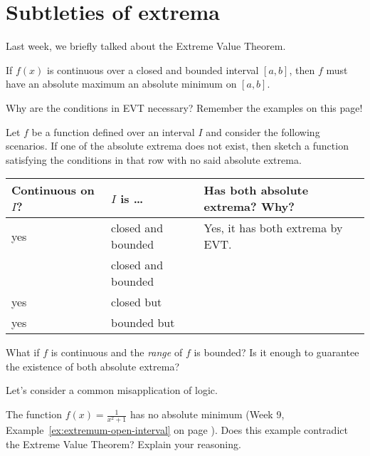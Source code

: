 \documentclass[../main.tex]{subfiles}
\begin{document}
 \section{Subtleties of extrema}
  Last week, we briefly talked about the Extreme Value Theorem.
  \begin{mdframed}[style=withref-compact]
    If \(f(x)\) is continuous over a closed and bounded interval \([a,b]\), then \(f\) must have an absolute maximum  an absolute minimum on \([a,b]\).

  \end{mdframed}

  Why are the conditions  in EVT necessary? Remember the examples on this page!

  \begin{example}
    Let \(f\) be a function defined over an interval \(I\) and consider the following scenarios. If one of the absolute extrema does not exist, then sketch a function satisfying the conditions in that row with no said absolute extrema.

    \begin{center}
      \begin{tabular}{p{1in}|l|p{4in}}
        \parbox{1in}{Continuous\\on \(I\)?} & \(I\) is \ldots{} & Has both absolute extrema? Why? \\ \midrule
        yes & closed and bounded & Yes, it has both extrema by EVT. \\\midrule
         & closed and bounded & \\[1in] \midrule
        yes & closed but  & \\[1in] \midrule
        yes & bounded but  & \\[1in]
      \end{tabular}
    \end{center}

    \faComment{} What if \(f\) is continuous and the \emph{range} of \(f\) is bounded? Is it enough to guarantee the existence of both absolute extrema? 

  \end{example}

  \medskip{}
  Let's consider a common misapplication of logic.
  \begin{example}
    The function \(f(x) = \frac{1}{x^{2} + 1}\) has no absolute minimum (Week 9, Example~\ref{ex:extremum-open-interval} on page \pageref{ex:extremum-open-interval}). Does this example contradict the Extreme Value Theorem? Explain your reasoning.
    \vfill{}
    \clearpage
  \end{example}
\end{document}
